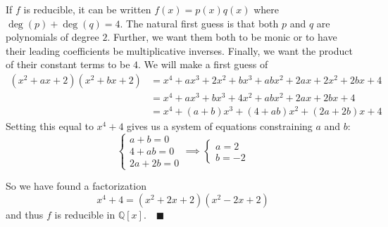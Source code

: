 \documentclass[12pt]{article}
\newcommand{\qed}{\quad \blacksquare}
\newcommand{\Q}{\mathbb{Q}}
\begin{document}
\begin{enumerate}[label=(\alph*)]
            \color{blue}
                If $f$ is reducible, it can be written $f(x) = p(x)q(x)$ where $\deg(p) + \deg(q) = 4$. The natural first guess is that both $p$ and $q$ are polynomials of degree $2$. Further, we want them both to be monic or to have their leading coefficients be multiplicative inverses. Finally, we want the product of their constant terms to be $4$. We will make a first guess of
                \begin{align*}
                    (x^2 + ax + 2)(x^2 + bx + 2) &= x^4 + ax^3 + 2x^2 + bx^3 + abx^2 + 2ax + 2x^2 + 2bx + 4\\
                    &= x^4 + ax^3 + bx^3 + 4x^2 + abx^2 + 2ax + 2bx + 4\\
                    &= x^4 + (a + b)x^3 + (4 + ab)x^2 + (2a + 2b)x + 4
                \end{align*}
                Setting this equal to $x^4 + 4$ gives us a system of equations constraining $a$ and $b$:
                \[\begin{cases}
                    a + b = 0\\
                    4 + ab = 0\\
                    2a + 2b = 0
                \end{cases} \implies \begin{cases}
                    a = 2\\
                    b = -2
                \end{cases}\]

                So we have found a factorization 
                \[x^4 + 4 = (x^2 + 2x + 2)(x^2 -2x + 2)\]
                and thus $f$ is reducible in $\Q[x]. \qed$
            \color{black}
    \end{enumerate}


\pagebreak
\end{document}
